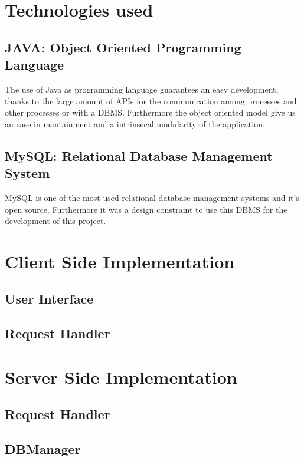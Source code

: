 \section{Technologies used}

\subsection{JAVA: Object Oriented Programming Language}
The use of Java as programming language guarantees an easy development, thanks to the large amount of APIs for the communication among processes and other processes or with a DBMS. Furthermore the object oriented model give us an ease in mantainment and a intrinsecal modularity of the application.
\subsection{MySQL: Relational Database Management System}
MySQL is one of the most used relational database management systems and it's open source. Furthermore it was a design constraint to use this DBMS for the development of this project.

\section {Client Side Implementation}
\subsection {User Interface}
\subsection {Request Handler}
\section {Server Side Implementation}
\subsection {Request Handler}
\subsection {DBManager}
